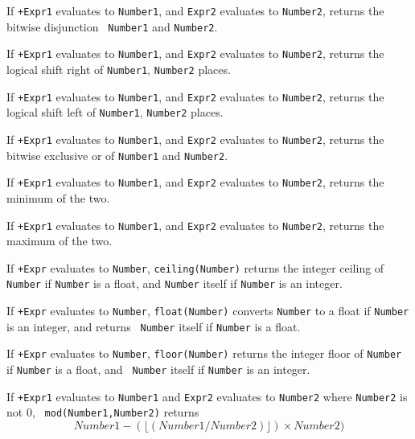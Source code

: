 \begin{description}
 If {\tt +Expr1} evaluates to {\tt Number1}, and {\tt Expr2}
evaluates to {\tt Number2}, returns the bitwise disjunction {\tt
Number1} and {\tt Number2}.

 If {\tt +Expr1} evaluates to {\tt Number1}, and {\tt Expr2}
evaluates to {\tt Number2}, returns the logical shift right of 
{\tt Number1}, {\tt Number2} places.

 If {\tt +Expr1} evaluates to {\tt Number1}, and {\tt Expr2}
evaluates to {\tt Number2}, returns the logical shift left of 
{\tt Number1}, {\tt Number2} places.

 If {\tt +Expr1} evaluates to {\tt Number1}, and {\tt Expr2}
evaluates to {\tt Number2}, returns the bitwise exclusive or of 
{\tt Number1} and {\tt Number2}.

 If {\tt +Expr1} evaluates to {\tt Number1}, and
{\tt Expr2} evaluates to {\tt Number2}, returns the minimum of the
two.

 If {\tt +Expr1} evaluates to {\tt Number1}, and
{\tt Expr2} evaluates to {\tt Number2}, returns the maximum of the
two.

If {\tt +Expr} evaluates to {\tt Number}, {\tt ceiling(Number)}
returns the integer ceiling of {\tt Number} if {\tt Number} is a
float, and {\tt Number} itself if {\tt Number} is an integer.

 If
{\tt +Expr} evaluates to {\tt Number}, {\tt float(Number)} converts 
{\tt Number} to a float if {\tt Number} is an integer, and returns {\tt
Number} itself if {\tt Number} is a float.

 If
{\tt +Expr} evaluates to {\tt Number}, {\tt floor(Number)} returns the
integer floor of {\tt Number} if {\tt Number} is a float, and {\tt
Number} itself if {\tt Number} is an integer.

If {\tt +Expr1} evaluates to {\tt Number1} and {\tt Expr2} evaluates
to {\tt Number2} where {\tt Number2} is not 0, {\tt
mod(Number1,Number2)} returns
\[
	Number1 - (\lfloor (Number1 / Number2) \rfloor) \times Number2)
\]


\end{description}
